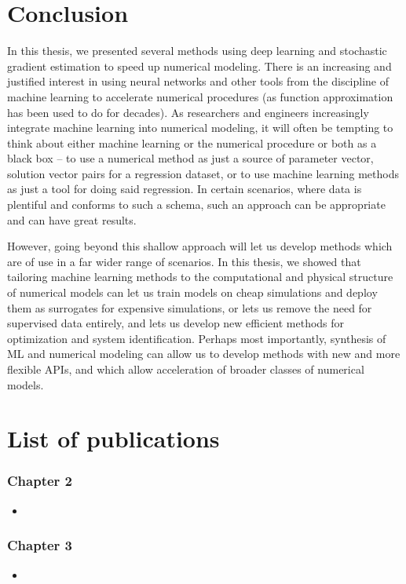 \documentclass{puthesis}
\begin{document}
\chapter{Conclusion}
In this thesis, we presented several methods using deep learning and
stochastic gradient estimation to speed up numerical modeling.
There is an increasing and justified interest in using neural networks and other
tools from the discipline of machine learning to accelerate numerical procedures
(as function approximation has been used to do for decades).
As researchers and engineers increasingly integrate machine learning into
numerical modeling, it will often be tempting to think about either machine learning
or the numerical procedure or both as a black box
-- to use a numerical method as just a source of parameter vector, solution vector
pairs for a regression dataset, or to use machine learning methods as just a tool
for doing said regression.
In certain scenarios, where data is plentiful and conforms to such a schema,
such an approach can be appropriate and can have great results.

However, going beyond this shallow approach will let us develop methods which
are of use in a far wider range of scenarios.
In this thesis, we showed that
tailoring machine learning methods to the computational and physical structure of
numerical models can let us train models on cheap simulations and deploy them
as surrogates for expensive simulations, or lets us remove the need for
supervised data entirely,
and lets us develop new efficient methods for optimization and system identification.
Perhaps most importantly, synthesis of ML and numerical modeling can allow
us to develop methods with new and more flexible APIs, and which allow acceleration of
broader classes of numerical models.




\appendix

\chapter{List of publications}
\subsection{Chapter 2}
\begin{itemize}
\item {}
\end{itemize}

\subsection{Chapter 3}
\begin{itemize}
  \item {}
\end{itemize}
\end{document}

